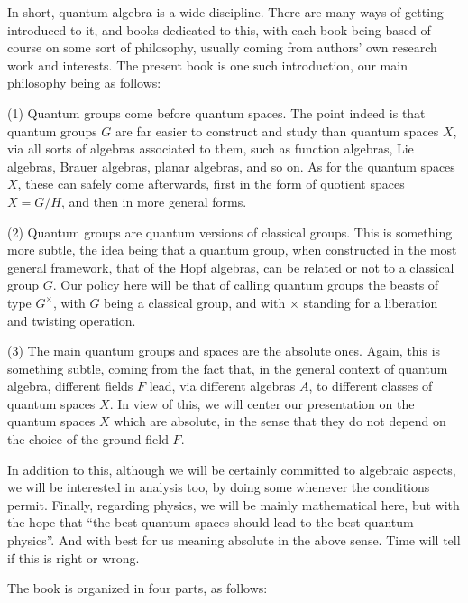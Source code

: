 \documentclass[12pt]{amsbook}
\begin{document}
\bigskip

In short, quantum algebra is a wide discipline. There are many ways of getting introduced to it, and books dedicated to this, with each book being based of course on some sort of philosophy, usually coming from authors' own research work and interests. The present book is one such introduction, our main philosophy being as follows:

\bigskip

(1) Quantum groups come before quantum spaces. The point indeed is that quantum groups $G$ are far easier to construct and study than quantum spaces $X$, via all sorts of algebras associated to them, such as function algebras, Lie algebras, Brauer algebras, planar algebras, and so on. As for the quantum spaces $X$, these can safely come afterwards, first in the form of quotient spaces $X=G/H$, and then in more general forms.

\bigskip

(2) Quantum groups are quantum versions of classical groups. This is something more subtle, the idea being that a quantum group, when constructed in the most general framework, that of the Hopf algebras, can be related or not to a classical group $G$. Our policy here will be that of calling quantum groups the beasts of type $G^\times$, with $G$ being a classical group, and with $\times$ standing for a liberation and twisting operation. 

\bigskip

(3) The main quantum groups and spaces are the absolute ones. Again, this is something subtle, coming from the fact that, in the general context of quantum algebra, different fields $F$ lead, via different algebras $A$, to different classes of quantum spaces $X$. In view of this, we will center our presentation on the quantum spaces $X$ which are absolute, in the sense that they do not depend on the choice of the ground field $F$.

\bigskip

In addition to this, although we will be certainly committed to algebraic aspects, we will be interested in analysis too, by doing some whenever the conditions permit. Finally, regarding physics, we will be mainly mathematical here, but with the hope that ``the best quantum spaces should lead to the best quantum physics''. And with best for us meaning absolute in the above sense. Time will tell if this is right or wrong.

\bigskip

The book is organized in four parts, as follows:
\end{document}
